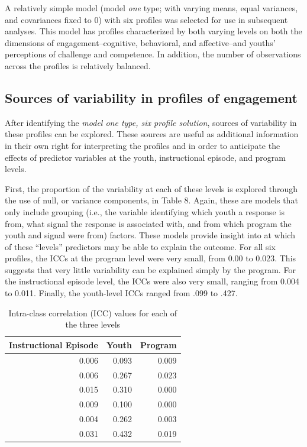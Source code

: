 \documentclass[]{book}
\theoremstyle{definition}
\theoremstyle{definition}
\theoremstyle{definition}
\theoremstyle{remark}
\begin{document}
A relatively simple model (model \emph{one} type; with varying means,
equal variances, and covariances fixed to 0) with six profiles was
selected for use in subsequent analyses. This model has profiles
characterized by both varying levels on both the dimensions of
engagement--cognitive, behavioral, and affective--and youths'
perceptions of challenge and competence. In addition, the number of
observations across the profiles is relatively balanced.

\subsection{Sources of variability in profiles of
engagement}\label{sources-of-variability-in-profiles-of-engagement}

After identifying the \emph{model one type, six profile solution},
sources of variability in these profiles can be explored. These sources
are useful as additional information in their own right for interpreting
the profiles and in order to anticipate the effects of predictor
variables at the youth, instructional episode, and program levels.

First, the proportion of the variability at each of these levels is
explored through the use of null, or variance components, in Table 8.
Again, these are models that only include grouping (i.e., the variable
identifying which youth a response is from, what signal the response is
associated with, and from which program the youth and signal were from)
factors. These models provide insight into at which of these ``levels''
predictors may be able to explain the outcome. For all six profiles, the
ICCs at the program level were very small, from 0.00 to 0.023. This
suggests that very little variability can be explained simply by the
program. For the instructional episode level, the ICCs were also very
small, ranging from 0.004 to 0.011. Finally, the youth-level ICCs ranged
from .099 to .427.

\begin{landscape}\begin{table}

\caption{\label{tab:unnamed-chunk-11}Intra-class correlation (ICC) values for each of the three levels}
\centering
\begin{tabular}[t]{rrr}
\toprule
Instructional Episode & Youth & Program\\
\midrule
0.006 & 0.093 & 0.009\\
0.006 & 0.267 & 0.023\\
0.015 & 0.310 & 0.000\\
0.009 & 0.100 & 0.000\\
0.004 & 0.262 & 0.003\\
0.031 & 0.432 & 0.019\\
\bottomrule
\end{tabular}
\end{table}
\end{landscape}
\end{document}
